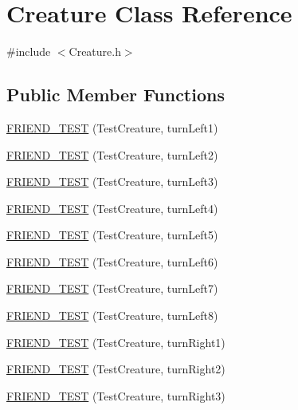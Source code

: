 \hypertarget{classCreature}{\section{Creature Class Reference}
\label{classCreature}
}


{\ttfamily \#include $<$Creature.\-h$>$}

\subsection*{Public Member Functions}
\begin{DoxyCompactItemize}
\item 
\hyperlink{classCreature_a0ebf3cca6e683b746bb1a1da31a06471}{F\-R\-I\-E\-N\-D\-\_\-\-T\-E\-S\-T} (Test\-Creature, turn\-Left1)
\item 
\hyperlink{classCreature_ab35cf458e9c163dc39365c75eddb2f2e}{F\-R\-I\-E\-N\-D\-\_\-\-T\-E\-S\-T} (Test\-Creature, turn\-Left2)
\item 
\hyperlink{classCreature_adf6ee0e3f9dd2ec77c3c00da3edd1ac0}{F\-R\-I\-E\-N\-D\-\_\-\-T\-E\-S\-T} (Test\-Creature, turn\-Left3)
\item 
\hyperlink{classCreature_a76e6fc5bef9c7d5182c8b1c5eabf3d03}{F\-R\-I\-E\-N\-D\-\_\-\-T\-E\-S\-T} (Test\-Creature, turn\-Left4)
\item 
\hyperlink{classCreature_a605e705c056550b1fde3dbb3110868a2}{F\-R\-I\-E\-N\-D\-\_\-\-T\-E\-S\-T} (Test\-Creature, turn\-Left5)
\item 
\hyperlink{classCreature_a041e5d2affc1a80f335db4f77a6b69b3}{F\-R\-I\-E\-N\-D\-\_\-\-T\-E\-S\-T} (Test\-Creature, turn\-Left6)
\item 
\hyperlink{classCreature_a175cb2dbdd3d1e919b3db307e0c4228a}{F\-R\-I\-E\-N\-D\-\_\-\-T\-E\-S\-T} (Test\-Creature, turn\-Left7)
\item 
\hyperlink{classCreature_a39f7fd8665275357f6a9cc879b9b7a11}{F\-R\-I\-E\-N\-D\-\_\-\-T\-E\-S\-T} (Test\-Creature, turn\-Left8)
\item 
\hyperlink{classCreature_a1626e291f14f020be2c4775687534c12}{F\-R\-I\-E\-N\-D\-\_\-\-T\-E\-S\-T} (Test\-Creature, turn\-Right1)
\item 
\hyperlink{classCreature_a7eabdfe07632efa6224d68237ad0ffb6}{F\-R\-I\-E\-N\-D\-\_\-\-T\-E\-S\-T} (Test\-Creature, turn\-Right2)
\item 
\hyperlink{classCreature_ade0883964de8520e24887a37327c3306}{F\-R\-I\-E\-N\-D\-\_\-\-T\-E\-S\-T} (Test\-Creature, turn\-Right3)
\item 

\end{DoxyCompactItemize}
